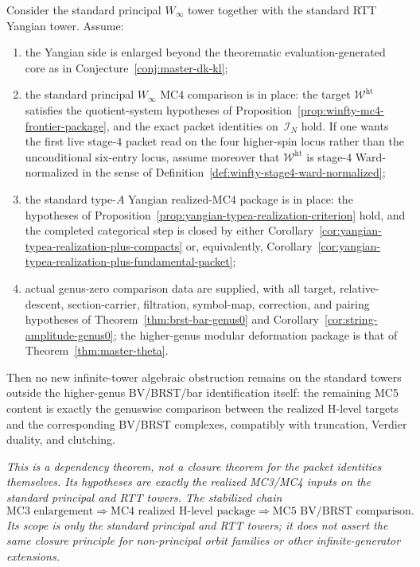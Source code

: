 \begin{proposition}
\label{prop:standard-tower-mc5-reduction}
Consider the standard principal
\texorpdfstring{$W_\infty$}{W_infty} tower together with the standard RTT
Yangian tower.  Assume:
\begin{enumerate}[label=\textup{(\roman*)}]
\item the Yangian side is enlarged beyond the theorematic
  evaluation-generated core as in
  Conjecture~\ref{conj:master-dk-kl};
\item the standard principal \texorpdfstring{$W_\infty$}{W_infty}
  MC4 comparison is in place: the target $\mathcal{W}^{\mathrm{ht}}$
  satisfies the quotient-system hypotheses of
  Proposition~\ref{prop:winfty-mc4-frontier-package}, and the exact
  packet identities on~$\mathcal{I}_N$ hold.  If one wants the first
  live stage-$4$ packet read on the four higher-spin locus rather than
  the unconditional six-entry locus, assume moreover that
  $\mathcal{W}^{\mathrm{ht}}$ is stage-$4$ Ward-normalized in the
  sense of Definition~\ref{def:winfty-stage4-ward-normalized};
\item the standard type-$A$ Yangian realized-MC4 package is in place:
  the hypotheses of
  Proposition~\ref{prop:yangian-typea-realization-criterion} hold, and
  the completed categorical step is closed by either
  Corollary~\ref{cor:yangian-typea-realization-plus-compacts} or,
  equivalently,
  Corollary~\ref{cor:yangian-typea-realization-plus-fundamental-packet};
\item actual genus-zero comparison data are supplied, with all target, relative-descent, section-carrier, filtration, symbol-map, correction, and pairing hypotheses of Theorem~\ref{thm:brst-bar-genus0} and Corollary~\ref{cor:string-amplitude-genus0};
  the higher-genus modular deformation package is that of Theorem~\ref{thm:master-theta}.
\end{enumerate}
Then no new infinite-tower algebraic obstruction remains on the
standard towers outside the higher-genus BV/BRST/bar identification
itself: the remaining MC5 content is exactly the genuswise comparison
between the realized H-level targets and the corresponding BV/BRST
complexes, compatibly with truncation, Verdier duality, and clutching.

\emph{This is a dependency theorem, not a closure theorem for the
packet identities themselves.  Its hypotheses are exactly the realized
MC3/MC4 inputs on the standard principal and RTT towers.  The
stabilized chain
\[
\text{MC3 enlargement}
\Longrightarrow
\text{MC4 realized H-level package}
\Longrightarrow
\text{MC5 BV/BRST comparison}.
\]
Its scope is only the standard principal and RTT towers; it does not
assert the same closure principle for non-principal orbit families or
other infinite-generator extensions.}
\end{proposition}

